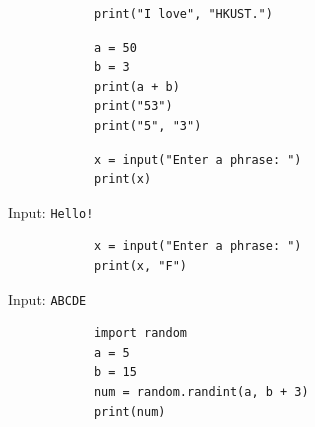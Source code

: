 \documentclass[dvipsnames, svgnames, x11names, handout]{beamer}
\begin{document}
\begin{frame}[fragile]{}
    \begin{center}
        \begin{verbatim}
            print("I love", "HKUST.")
        \end{verbatim}
    \end{center}
\end{frame}

\begin{frame}[fragile]{}
    \begin{center}
        \begin{verbatim}
            a = 50
            b = 3
            print(a + b)
            print("53")
            print("5", "3")
        \end{verbatim}
    \end{center}
\end{frame}

\begin{frame}[fragile]{}
    \begin{center}
        \begin{verbatim}
            x = input("Enter a phrase: ")
            print(x)
        \end{verbatim}
    \end{center}
    Input: \texttt{Hello!}
\end{frame}

\begin{frame}[fragile]{}
    \begin{center}
        \begin{verbatim}
            x = input("Enter a phrase: ")
            print(x, "F")
        \end{verbatim}
    \end{center}
    Input: \texttt{ABCDE}
\end{frame}

\begin{frame}[fragile]{}
    \begin{center}
        \begin{verbatim}
            import random
            a = 5
            b = 15
            num = random.randint(a, b + 3)
            print(num)
        \end{verbatim}
    \end{center}
\end{frame}
\end{document}
